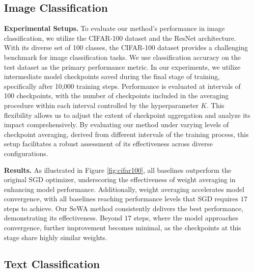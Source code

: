 \subsection{Image Classification}
\textbf{Experimental Setups.} 
To evaluate our method's performance in image classification, we utilize the CIFAR-100 dataset and the ResNet architecture. With its diverse set of 100 classes, the CIFAR-100 dataset provides a challenging benchmark for image classification tasks. We use classification accuracy on the test dataset as the primary performance metric.
%
In our experiments, we utilize intermediate model checkpoints saved during the final stage of training, specifically after 10,000 training steps. 
Performance is evaluated at intervals of 100 checkpoints, with the number of checkpoints included in the averaging procedure within each interval controlled by the hyperparameter $K$.
This flexibility allows us to adjust the extent of checkpoint aggregation and analyze its impact comprehensively.
By evaluating our method under varying levels of checkpoint averaging, derived from different intervals of the training process, this setup facilitates a robust assessment of its effectiveness across diverse configurations. 


\textbf{Results.}
As illustrated in Figure \ref{fig:cifar100}, all baselines outperform the original SGD optimizer, underscoring the effectiveness of weight averaging in enhancing model performance. Additionally, weight averaging accelerates model convergence, with all baselines reaching performance levels that SGD requires $17$ steps to achieve.
Our SeWA method consistently delivers the best performance, demonstrating its effectiveness. Beyond $17$ steps, where the model approaches convergence, further improvement becomes minimal, as the checkpoints at this stage share highly similar weights.

\subsection{Text Classification}


